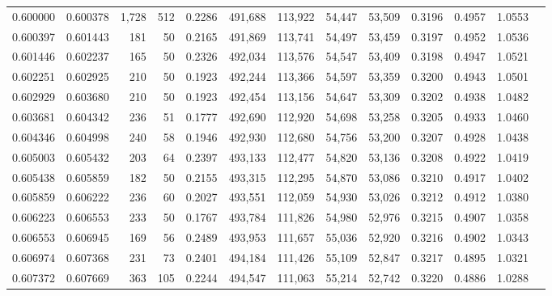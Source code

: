 \begin{tabular}{rrrrrrrrrrrrr}
0.600000 & 0.600378 & 1,728 & 512 &                                     0.2286 & 491,688 & 113,922 &  54,447 &  53,509 & 0.3196 & 0.4957 & 1.0553 \\
0.600397 & 0.601443 &   181 &  50 &                                     0.2165 & 491,869 & 113,741 &  54,497 &  53,459 & 0.3197 & 0.4952 & 1.0536 \\
0.601446 & 0.602237 &   165 &  50 &                                     0.2326 & 492,034 & 113,576 &  54,547 &  53,409 & 0.3198 & 0.4947 & 1.0521 \\
0.602251 & 0.602925 &   210 &  50 &                                     0.1923 & 492,244 & 113,366 &  54,597 &  53,359 & 0.3200 & 0.4943 & 1.0501 \\
0.602929 & 0.603680 &   210 &  50 &                                     0.1923 & 492,454 & 113,156 &  54,647 &  53,309 & 0.3202 & 0.4938 & 1.0482 \\
0.603681 & 0.604342 &   236 &  51 &                                     0.1777 & 492,690 & 112,920 &  54,698 &  53,258 & 0.3205 & 0.4933 & 1.0460 \\
0.604346 & 0.604998 &   240 &  58 &                                     0.1946 & 492,930 & 112,680 &  54,756 &  53,200 & 0.3207 & 0.4928 & 1.0438 \\
0.605003 & 0.605432 &   203 &  64 &                                     0.2397 & 493,133 & 112,477 &  54,820 &  53,136 & 0.3208 & 0.4922 & 1.0419 \\
0.605438 & 0.605859 &   182 &  50 &                                     0.2155 & 493,315 & 112,295 &  54,870 &  53,086 & 0.3210 & 0.4917 & 1.0402 \\
0.605859 & 0.606222 &   236 &  60 &                                     0.2027 & 493,551 & 112,059 &  54,930 &  53,026 & 0.3212 & 0.4912 & 1.0380 \\
0.606223 & 0.606553 &   233 &  50 &                                     0.1767 & 493,784 & 111,826 &  54,980 &  52,976 & 0.3215 & 0.4907 & 1.0358 \\
0.606553 & 0.606945 &   169 &  56 &                                     0.2489 & 493,953 & 111,657 &  55,036 &  52,920 & 0.3216 & 0.4902 & 1.0343 \\
0.606974 & 0.607368 &   231 &  73 &                                     0.2401 & 494,184 & 111,426 &  55,109 &  52,847 & 0.3217 & 0.4895 & 1.0321 \\
0.607372 & 0.607669 &   363 & 105 &                                     0.2244 & 494,547 & 111,063 &  55,214 &  52,742 & 0.3220 & 0.4886 & 1.0288 \\

\end{tabular}
